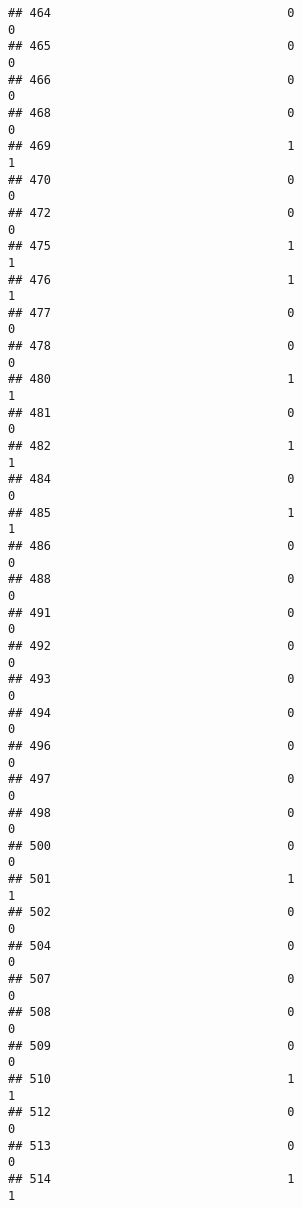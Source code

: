 \documentclass[
]{article}
\begin{document}
\begin{verbatim}
## 464                                 0                                0
## 465                                 0                                0
## 466                                 0                                0
## 468                                 0                                0
## 469                                 1                                1
## 470                                 0                                0
## 472                                 0                                0
## 475                                 1                                1
## 476                                 1                                1
## 477                                 0                                0
## 478                                 0                                0
## 480                                 1                                1
## 481                                 0                                0
## 482                                 1                                1
## 484                                 0                                0
## 485                                 1                                1
## 486                                 0                                0
## 488                                 0                                0
## 491                                 0                                0
## 492                                 0                                0
## 493                                 0                                0
## 494                                 0                                0
## 496                                 0                                0
## 497                                 0                                0
## 498                                 0                                0
## 500                                 0                                0
## 501                                 1                                1
## 502                                 0                                0
## 504                                 0                                0
## 507                                 0                                0
## 508                                 0                                0
## 509                                 0                                0
## 510                                 1                                1
## 512                                 0                                0
## 513                                 0                                0
## 514                                 1                                1

\end{verbatim}
\end{document}

